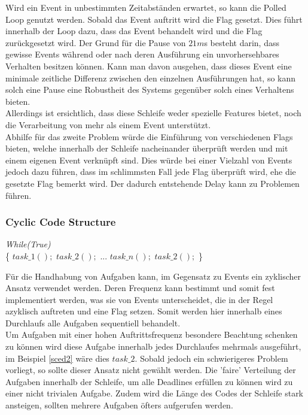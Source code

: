 Wird ein Event in unbestimmten Zeitabständen erwartet, so kann die Polled Loop genutzt werden. Sobald das Event auftritt wird die Flag gesetzt. Dies führt innerhalb der Loop dazu, dass das Event behandelt wird und die Flag zurückgesetzt wird. Der Grund für die Pause von $21m$s besteht darin, dass gewisse Events während oder nach deren Ausführung ein unvorhersehbares Verhalten besitzen können. Kann man davon ausgehen, dass dieses Event eine minimale zeitliche Differenz zwischen den einzelnen Ausführungen hat, so kann solch eine Pause eine Robustheit des Systems gegenüber solch eines Verhaltens bieten.\\
Allerdings ist ersichtlich, dass diese Schleife weder spezielle Features bietet, noch die Verarbeitung von mehr als einem Event unterstützt.\\
Abhilfe für das zweite Problem würde die Einführung von verschiedenen Flags bieten, welche innerhalb der Schleife nacheinander überprüft werden und mit einem eigenen Event verknüpft sind. Dies würde bei einer Vielzahl von Events jedoch dazu führen, dass im schlimmsten Fall jede Flag überprüft wird, ehe die gesetzte Flag bemerkt wird. Der dadurch entstehende Delay kann zu Problemen führen.

\subsubsection{Cyclic Code Structure}
\begin{algorithm}
\label{sced2}
\begin{algorithmic}[1]

\BState \textit{While(True)}\\
\{
\State $task\_1();$
\State $task\_2();$
\State ...
\State $task\_n();$
\State $task\_2();$
\}

\end{algorithmic}
\end{algorithm}

Für die Handhabung von Aufgaben kann, im Gegensatz zu Events ein zyklischer Ansatz verwendet werden. Deren Frequenz kann bestimmt und somit fest implementiert werden, was sie von Events unterscheidet, die in der Regel azyklisch auftreten und eine Flag setzen. Somit werden hier innerhalb eines Durchlaufs alle Aufgaben sequentiell behandelt.\\
Um Aufgaben mit einer hohen Auftrittsfrequenz besondere Beachtung schenken zu können wird diese Aufgabe innerhalb jedes Durchlaufes mehrmals ausgeführt, im Beispiel \ref{sced2} wäre dies $task\_2$. Sobald jedoch ein schwierigeres Problem vorliegt, so sollte dieser Ansatz nicht gewählt werden. Die 'faire' Verteilung der Aufgaben innerhalb der Schleife, um alle Deadlines erfüllen zu können wird zu einer nicht trivialen Aufgabe. Zudem wird die Länge des Codes der Schleife stark ansteigen, sollten mehrere Aufgaben öfters aufgerufen werden.

